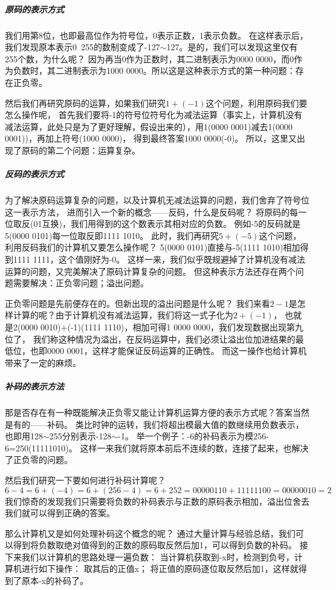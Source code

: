 \documentclass[UTF8]{article}
\begin{document}
\subparagraph{原码的表示方式}
我们用第8位，也即最高位作为符号位，0表示正数，1表示负数。
在这样表示后，我们发现原本表示0~255的数制变成了-127$\sim $127。是的，我们可以发现这里仅有255个数，为什么呢？
因为再当0作为正数时，其二进制表示为0000 0000，而0作为负数时，其二进制表示为1000 0000。所以这是这种表示方式的第一种问题：存在正负零。

然后我们再研究原码的运算，如果我们研究$1+(-1)$这个问题，利用原码我们要怎么操作呢，
首先我们要将-1的符号位符号化为减法运算（事实上，计算机没有减法运算，此处只是为了更好理解，假设出来的），用1(0000 0001)减去1(0000 0001))，再加上符号(1000 0000)，
得到最终答案1000 0000(-0)。
所以，这里又出现了原码的第二个问题：运算复杂。

\subparagraph{反码的表示方式}
为了解决原码运算复杂的问题，以及计算机无减法运算的问题，我们舍弃了符号位这一表示方法，
进而引入一个新的概念——反码，什么是反码呢？
将原码的每一位取反(01互换)，我们用得到的这个数表示其相对应的负数。
例如-5的反码就是5(0000 0101)每一位取反即1111 1010。
此时，我们再研究$5+(-5)$这个问题，利用反码我们的计算机又要怎么操作呢？
5(0000 0101)直接与-5(1111 1010)相加得到1111 1111，这个值刚好为-0。
这样一来，我们似乎既规避掉了计算机没有减法运算的问题，又完美解决了原码计算复杂的问题。
但这种表示方法还存在两个问题需要解决：正负零问题；溢出问题。

正负零问题是先前便存在的。但新出现的溢出问题是什么呢？
我们来看$2-1$是怎样计算的呢？由于计算机没有减法运算，我们将这一式子化为$2+(-1)$，
也就是2(0000 0010)+(-1)(1111 1110)，相加可得1 0000 0000，我们发现数据出现第九位了，
我们称这种情况为溢出，在反码运算中，我们必须让溢出位加进结果的最低位，也即0000 0001，这样才能保证反码运算的正确性。
而这一操作也给计算机带来了一定的麻烦。

\subparagraph{补码的表示方法}
那是否存在有一种既能解决正负零又能让计算机运算方便的表示方式呢？答案当然是有的——补码。
类比时钟的运转，我们将超出模最大值的数继续用负数表示，
也即用128$\sim $255分别表示-128$\sim $-1。
举一个例子：-6的补码表示为模256-6=250(11111010)。
这样一来我们就将原本前后不连续的数，连接了起来，也解决了正负零的问题。

然后我们研究一下要如何进行补码计算呢？
$$6-4=6+(-4)=6+(256-4)=6+252
=0000 0110+1111 1100=0000 0010=2$$
我们惊奇的发现我们只需要将负数的补码表示与正数的原码表示相加，溢出位舍去我们就可以得到正确的答案。

那么计算机又是如何处理补码这个概念的呢？
通过大量计算与经验总结，我们可以得到将负数取绝对值得到的正数的原码取反然后加1，可以得到负数的补码。
接下来我们以计算机的思路处理一遍负数：
当计算机获取到-x时，检测到负号，计算机进行如下操作：
取其后的正值x；
将正值的原码逐位取反然后加1，这样就得到了原本-x的补码了。
\end{document}

